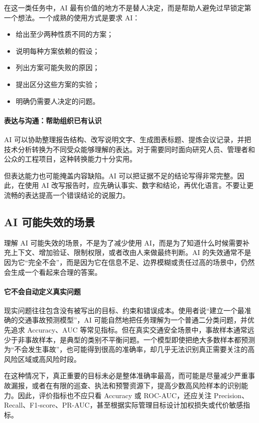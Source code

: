 在这一类任务中，AI 最有价值的地方不是替人决定，而是帮助人避免过早锁定第一个想法。一个成熟的使用方式是要求 AI：

\begin{itemize}
  \item 给出至少两种性质不同的方案；
  \item 说明每种方案依赖的假设；
  \item 列出方案可能失败的原因；
  \item 提出区分这些方案的实验；
  \item 明确仍需要人决定的问题。
\end{itemize}

\paragraph{表达与沟通：帮助组织已有认识}

AI 可以协助整理报告结构、改写说明文字、生成图表标题、提炼会议记录，并把技术分析转换为不同受众能够理解的表达。对于需要同时面向研究人员、管理者和公众的工程项目，这种转换能力十分实用。

但表达能力也可能掩盖内容缺陷。AI 可以把证据不足的结论写得非常完整。因此，在使用 AI 改写报告时，应先确认事实、数字和结论，再优化语言。不要让更流畅的表达提高一个错误结论的说服力。

\subsection{AI 可能失效的场景}

理解 AI 可能失效的场景，不是为了减少使用 AI，而是为了知道什么时候需要补充上下文、增加验证、限制权限，或者改由人来做最终判断。AI 的失效通常不是因为它“完全不会”，而是因为它在信息不足、边界模糊或责任过高的场景中，仍然会生成一个看起来合理的答案。

\paragraph{它不会自动定义真实问题}

现实问题往往包含没有被写出的目标、约束和错误成本。使用者说“建立一个最准确的交通事故预测模型”，AI 可能自然地把任务理解为一个普通二分类问题，并优先追求 Accuracy、AUC 等常见指标。但在真实交通安全场景中，事故样本通常远少于非事故样本，是典型的类别不平衡问题。一个模型即使把绝大多数样本都预测为“不会发生事故”，也可能得到很高的准确率，却几乎无法识别真正需要关注的高风险区域或高风险时段。

在这种情况下，真正重要的目标未必是整体准确率最高，而可能是尽量减少严重事故漏报，或者在有限的巡查、执法和预警资源下，提高少数高风险样本的识别能力。因此，评价指标也不应只看 Accuracy 或 ROC-AUC，还应关注 Precision、Recall、F1-score、PR-AUC，甚至根据实际管理目标设计加权损失或代价敏感指标。

